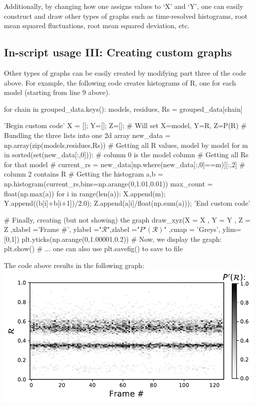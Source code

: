 \documentclass[fleqn,10pt,lineno]{wlpeerj} %
\newcommand{\n}[1]{{\color{red}#1}}
\begin{document}
\begin{enumerate}
Additionally, by changing how one assigns values to `X' and `Y', 
one can easily construct and draw other types of graphs such as time-resolved histograms, 
root mean squared fluctuations, root mean squared deviation, etc. 
\end{enumerate}

\subsection*{In-script usage III: Creating custom graphs}
Other types of \n{graphs} can be easily created by modifying part three of the code above. 
For example, the following code creates histograms of R, one for each model (starting from line 9 above).
\begin{python}[firstnumber=9]
	for chain in grouped_data.keys():
		models, residues, Rs = grouped_data[chain]
		
		'Begin custom code'
		X = []; Y=[]; Z=[]; # Will set X=model, Y=R, Z=P(R)
		# Bundling the three lists into one 2d array
		new_data =  np.array(zip(models,residues,Rs))
		# Getting all R values, model by model
		for m in sorted(set(new_data[:,0])): # column 0 is the model column
			# Getting all Rs for that model #
			current_rs = new_data[np.where(new_data[:,0]==m)][:,2] # column 2 contains R
			# Getting the histogram
			a,b = np.histogram(current_rs,bins=np.arange(0,1.01,0.01))
			max_count = float(np.max(a))
			for i in range(len(a)):
				X.append(m); Y.append((b[i]+b[i+1])/2.0); Z.append(a[i]/float(np.sum(a)));
		'End custom code'
		
		# Finally, creating (but not showing) the graph 
		draw_xyz(X = X       ,      Y = Y  ,                Z = Z
		   ,xlabel ='Frame #', ylabel ="$\mathcal{R}$",zlabel ="$P'(\mathcal{R})$"
			 ,cmap = 'Greys', ylim=[0,1])
		plt.yticks(np.arange(0,1.00001,0.2))
		# Now, we display the graph:
		plt.show() # ... one can also use plt.savefig() to save to file
\end{python}
The code above results in the following graph:\\
\includegraphics[width=0.5\linewidth]{automated_figures/example2.pdf}
\end{document}
